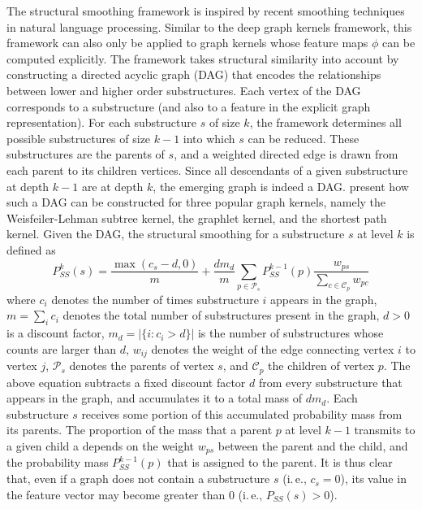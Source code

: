 \documentclass[twoside,11pt]{article}
\newcommand{\ie}{i.\,e., }
\begin{document}
The structural smoothing framework is inspired by recent smoothing techniques in natural language processing.
Similar to the deep graph kernels framework, this framework can also only be applied to graph kernels whose feature maps $\phi$ can be computed explicitly.
The framework takes structural similarity into account by constructing a directed acyclic graph (DAG) that encodes the relationships between lower and higher order substructures.
Each vertex of the DAG corresponds to a substructure (and also to a feature in the explicit graph representation).
For each substructure $s$ of size $k$, the framework determines all possible substructures of size $k-1$ into which $s$ can be reduced.
These substructures are the parents of $s$, and a weighted directed edge is drawn from each parent to its children vertices.
Since all descendants of a given substructure at depth $k-1$ are at depth $k$, the emerging graph is indeed a DAG.
 present how such a DAG can be constructed for three popular graph kernels, namely the Weisfeiler-Lehman subtree kernel, the graphlet kernel, and the shortest path kernel.
Given the DAG, the structural smoothing for a substructure $s$ at level $k$ is defined as
\begin{equation}
    P_{SS}^k(s) = \frac{\max(c_s-d,0)}{m} + \frac{d m_d}{m} \sum_{p \in \mathcal{P}_s} P_{SS}^{k-1}(p) \frac{w_{ps}}{\sum_{c \in \mathcal{C}_p} w_{pc}}
\end{equation}
where $c_i$ denotes the number of times substructure $i$ appears in the graph, $m = \sum_i c_i$ denotes the total number of substructures present in the graph, $d > 0$ is a discount factor, $m_d = |\{i : c_i > d\}|$ is the number of substructures whose counts are larger than $d$, $w_{ij}$ denotes the weight of the edge connecting vertex $i$ to vertex $j$, $\mathcal{P}_s$ denotes the parents of vertex $s$, and $\mathcal{C}_p$ the children of vertex $p$.
The above equation subtracts a fixed discount factor $d$ from every substructure that appears in the graph, and accumulates it to a total mass of $d m_d$.
Each substructure $s$ receives some portion of this accumulated probability mass from its parents.
The proportion of the mass that a parent $p$ at level $k-1$ transmits to a given child a depends on the weight $w_{ps}$ between the parent and the child, and the probability mass $P_{SS}^{k-1}(p)$ that is assigned to the parent.
It is thus clear that, even if a graph does not contain a substructure $s$ (\ie $c_s = 0$), its value in the feature vector may become greater than $0$ (\ie $P_{SS}(s) > 0$).
\end{document}
